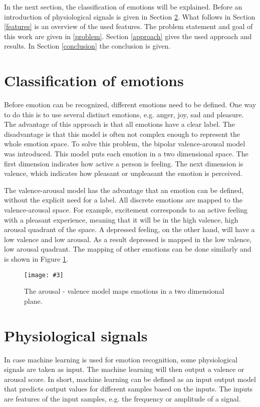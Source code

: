 \documentclass[11pt,journal,compsoc]{IEEEtran}
\newcommand{\npar}{\par \vspace{2.3ex plus 0.3ex minus 0.3ex}}
\newcommand{\mijnfiguur}[4][H]{            %
    \begin{figure}[#1]                      %
        \begin{center}                      %
            \texttt{[image: \#3]}        %
            \caption{#4\label{#3}}          %
        \end{center}
    \end{figure}
    }
\begin{document}
\npar

In the next section, the classification of emotions will be explained. Before an introduction of physiological signals is given in Section \ref{phyintro}. What follows in Section \ref{features} is an overview of the used features. The problem statement and goal of this work are given in \ref{problem}. Section \ref{approach} gives the used approach and results. In Section \ref{conclusion} the conclusion is given.

\section{Classification of emotions}\label{classification}
Before emotion can be recognized, different emotions need to be defined. One way to do this is to use several distinct emotions, e.g. anger, joy, sad and pleasure. The advantage of this approach is that all emotions have a clear label. The disadvantage is that this model is often not complex enough to represent the whole emotion space. To solve this problem, the bipolar valence-arousal model was introduced\cite{ExtendedPaper,RealTimeEEGEmotion}. This model puts each emotion in a two dimensional space. The first dimension indicates how active a person is feeling. The next dimension is valence, which indicates how pleasant or unpleasant the emotion is perceived. 

\npar

The valence-arousal model has the advantage that an emotion can be defined, without the explicit need for a label. All discrete emotions are mapped to the valence-arousal space. For example, excitement corresponds to an active feeling with a pleasant experience, meaning that it will be in the high valence, high arousal quadrant of the space. A depressed feeling, on the other hand, will have a low valence and low arousal. As a result depressed is mapped in the low valence, low arousal quadrant. The mapping of other emotions can be done similarly and is shown in Figure \ref{ArousalValenceModel}.

\mijnfiguur{width=0.4\textwidth}{ArousalValenceModel}{The arousal - valence model maps emotions in a two dimensional plane.\citep{ValArrFig}}

\section{Physiological signals} \label{phyintro}
In case machine learning is used for emotion recognition, some physiological signals are taken as input. The machine learning will then output a valence or arousal score. In short, machine learning can be defined as an input output model that predicts output values for different samples based on the inputs. The inputs are features of the input samples, e.g. the frequency or amplitude of a signal.
\end{document}
